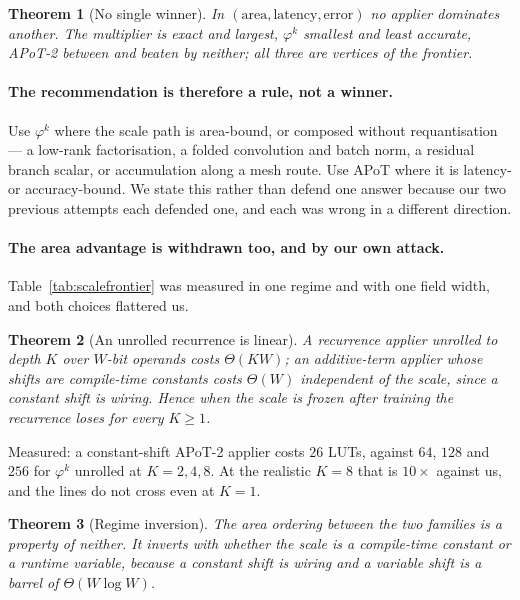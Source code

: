 \documentclass[11pt]{article}
\newtheorem{theorem}{Theorem}
\theoremstyle{definition}
\begin{document}
\begin{theorem}[No single winner]
\label{thm:threevertex}
In $(\text{area}, \text{latency}, \text{error})$ no applier dominates another.
The multiplier is exact and largest, $\varphi^{k}$ smallest and least accurate,
APoT-2 between and beaten by neither; all three are vertices of the frontier.
\end{theorem}

\paragraph{The recommendation is therefore a rule, not a winner.} Use
$\varphi^{k}$ where the scale path is area-bound, or composed without
requantisation --- a low-rank factorisation, a folded convolution and batch norm,
a residual branch scalar, or accumulation along a mesh route. Use APoT where it is
latency- or accuracy-bound. We state this rather than defend one answer because
our two previous attempts each defended one, and each was wrong in a different
direction.


\paragraph{The area advantage is withdrawn too, and by our own attack.}
Table~\ref{tab:scalefrontier} was measured in one regime and with one field
width, and both choices flattered us.

\begin{theorem}[An unrolled recurrence is linear]
\label{thm:unrolled}
A recurrence applier unrolled to depth $K$ over $W$-bit operands costs
$\Theta(KW)$; an additive-term applier whose shifts are compile-time constants
costs $\Theta(W)$ independent of the scale, since a constant shift is wiring.
Hence when the scale is frozen after training the recurrence loses for every
$K \ge 1$.
\end{theorem}

Measured: a constant-shift APoT-2 applier costs $26$ LUTs, against $64$, $128$
and $256$ for $\varphi^{k}$ unrolled at $K=2,4,8$. At the realistic $K=8$ that is
$10\times$ against us, and the lines do not cross even at $K=1$.

\begin{theorem}[Regime inversion]
\label{thm:regime}
The area ordering between the two families is a property of neither. It inverts
with whether the scale is a compile-time constant or a runtime variable, because
a constant shift is wiring and a variable shift is a barrel of
$\Theta(W\log W)$.
\end{theorem}
\end{document}
